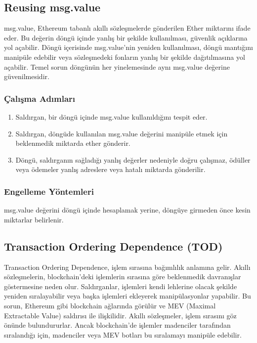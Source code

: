 \newpage

\subsection{Reusing msg.value}

msg.value, Ethereum tabanlı akıllı sözleşmelerde gönderilen Ether miktarını ifade eder. Bu değerin döngü içinde yanlış bir şekilde kullanılması, güvenlik açıklarına yol açabilir. Döngü içerisinde msg.value'nin yeniden kullanılması, döngü mantığını manipüle edebilir veya sözleşmedeki fonların yanlış bir şekilde dağıtılmasına yol açabilir. Temel sorun döngünün her yinelemesinde aynı msg.value değerine güvenilmesidir.

\subsubsection{Çalışma Adımları}

\begin{enumerate}
    \item Saldırgan, bir döngü içinde msg.value kullanıldığını tespit eder.
    \item Saldırgan, döngüde kullanılan msg.value değerini manipüle etmek için beklenmedik miktarda ether gönderir.
    \item Döngü, saldırganın sağladığı yanlış değerler nedeniyle doğru çalışmaz, ödüller veya ödemeler yanlış adreslere veya hatalı miktarda gönderilir.
\end{enumerate}

\subsubsection{Engelleme Yöntemleri}

msg.value değerini döngü içinde hesaplamak yerine, döngüye girmeden önce kesin miktarlar belirlenir.

\newpage

\subsection{Transaction Ordering Dependence (TOD)}

Transaction Ordering Dependence, işlem sırasına bağımlılık anlamına gelir. Akıllı sözleşmelerin, blockchain'deki işlemlerin sırasına göre beklenmedik davranışlar göstermesine neden olur. Saldırganlar, işlemleri kendi lehlerine olacak şekilde yeniden sıralayabilir veya başka işlemleri ekleyerek manipülasyonlar yapabilir. Bu sorun, Ethereum gibi blockchain ağlarında görülür ve MEV (Maximal Extractable Value) saldırısı ile ilişkilidir. Akıllı sözleşmeler, işlem sırasını göz önünde bulundururlar. Ancak blockchain'de işlemler madenciler tarafından sıralandığı için, madenciler veya MEV botları bu sıralamayı manipüle edebilir.


